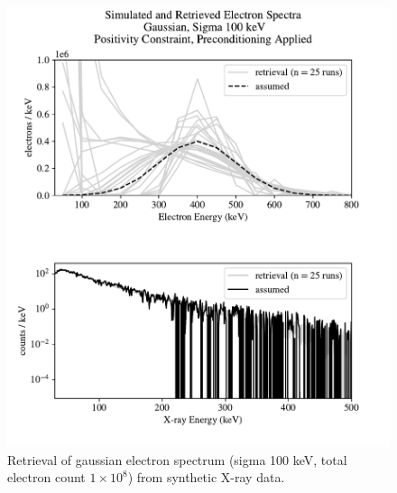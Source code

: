 \begin{figure}[p]
    \centering
    \includegraphics[width=\textwidth]{figures/chapter_4/synthetic_data_examples/gauss_100keV_posonly_preconditioning_1e8_particles}
    \caption{Retrieval of gaussian electron spectrum (sigma 100 keV, total electron count $1\times10^8$) from synthetic X-ray data.}
    \label{why_non_negative_is_good}
\end{figure}

